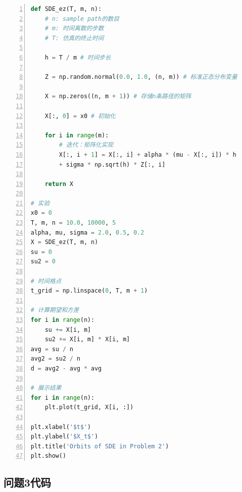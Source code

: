 \documentclass{article}
\begin{document}
\begin{lstlisting}[language = python, numbers=left, numberstyle=\tiny, keywordstyle=\color{blue!70}, commentstyle=\color{red!50!green!50!blue!50},frame=shadowbox,rulesepcolor=\color{red!20!green!20!blue!20},basicstyle=\ttfamily]
def SDE_ez(T, m, n): 
    # n: sample path的数目
    # m: 时间离散的步数
    # T: 仿真的终止时间
    
    h = T / m # 时间步长
    
    Z = np.random.normal(0.0, 1.0, (n, m)) # 标准正态分布变量
    
    X = np.zeros((n, m + 1)) # 存储n条路径的矩阵
    
    X[:, 0] = x0 # 初始化
    
    for i in range(m):
        # 迭代：矩阵化实现
        X[:, i + 1] = X[:, i] + alpha * (mu - X[:, i]) * h 
        + sigma * np.sqrt(h) * Z[:, i]
    
    return X

# 实验
x0 = 0
T, m, n = 10.0, 10000, 5
alpha, mu, sigma = 2.0, 0.5, 0.2
X = SDE_ez(T, m, n)
su = 0
su2 = 0

# 时间格点
t_grid = np.linspace(0, T, m + 1)

# 计算期望和方差
for i in range(n):
    su += X[i, m]
    su2 += X[i, m] * X[i, m]
avg = su / n
avg2 = su2 / n
d = avg2 - avg * avg

# 展示结果
for i in range(n):
    plt.plot(t_grid, X[i, :])

plt.xlabel('$t$')
plt.ylabel('$X_t$')
plt.title('Orbits of SDE in Problem 2')
plt.show()
\end{lstlisting}

\subsection{问题3代码}
\end{document}
